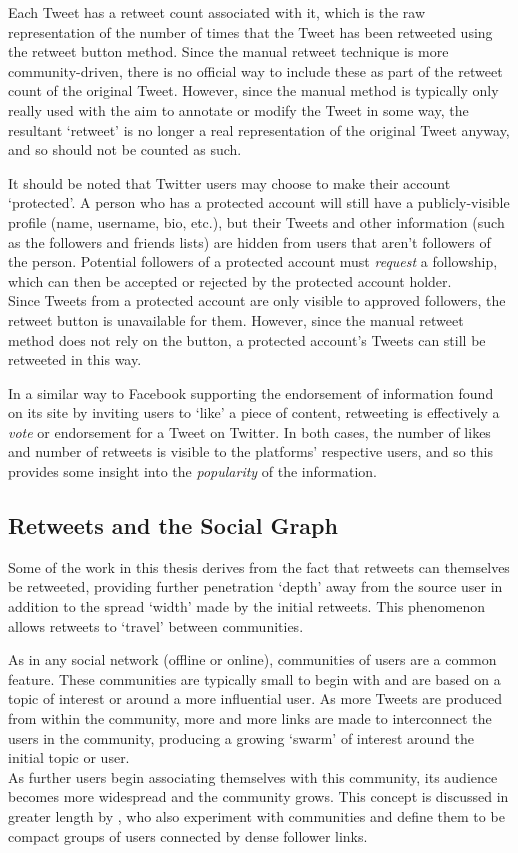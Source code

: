 Each Tweet has a retweet count associated with it, which is the raw representation of the number of times that the Tweet has been retweeted using the retweet button method. Since the manual retweet technique is more community-driven, there is no official way to include these as part of the retweet count of the original Tweet. However, since the manual method is typically only really used with the aim to annotate or modify the Tweet in some way, the resultant `retweet'  is no longer a real representation of the original Tweet anyway, and so should not be counted as such.

It should be noted that Twitter users may choose to make their account `protected'. A person who has a protected account will still have a publicly-visible profile (name, username, bio, etc.), but their Tweets and other information (such as the followers and friends lists) are hidden from users that aren't followers of the person. Potential followers of a protected account must \textit{request} a followship, which can then be accepted or rejected by the protected account holder. \\
Since Tweets from a protected account are only visible to approved followers, the retweet button is unavailable for them. However, since the manual retweet method does not rely on the button, a protected account's Tweets can still be retweeted in this way.

In a similar way to Facebook supporting the endorsement of information found on its site by inviting users to `like' a piece of content, retweeting is effectively a \textit{vote} or endorsement for a Tweet on Twitter. In both cases, the number of likes and number of retweets is visible to the platforms' respective users, and so this provides some insight into the \textit{popularity} of the information.\\


\subsection{Retweets and the Social Graph}
Some of the work in this thesis derives from the fact that retweets can themselves be retweeted, providing further penetration `depth' away from the source user in addition to the spread `width' made by the initial retweets. This phenomenon allows retweets to `travel' between communities.

As in any social network (offline or online), communities of users are a common feature. These communities are typically small to begin with and are based on a topic of interest or around a more influential user. As more Tweets are produced from within the community, more and more links are made to interconnect the users in the community, producing a growing `swarm' of interest around the initial topic or user. \\
As further users begin associating themselves with this community, its audience becomes more widespread and the community grows. This concept is discussed in greater length by \cite{java07}, who also experiment with communities and define them to be compact groups of users connected by dense follower links.

